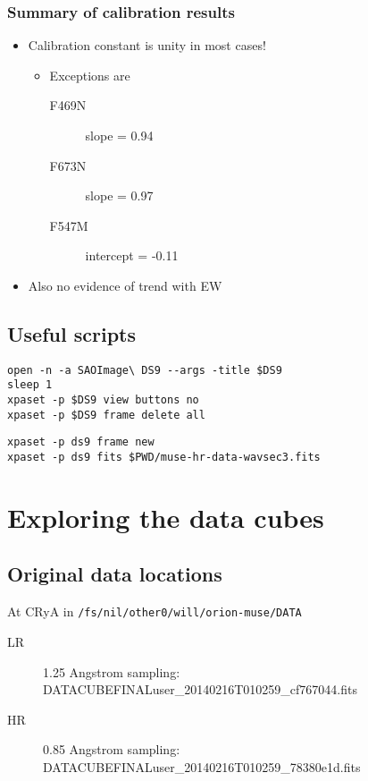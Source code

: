 \documentclass[11pt]{article}
\begin{document}
\subsubsection{Summary of calibration results}
\label{sec:orgheadline42}
\begin{itemize}
\item Calibration constant is unity in most cases!
\begin{itemize}
\item Exceptions are
\begin{description}
\item[{F469N}] slope = 0.94
\item[{F673N}] slope = 0.97
\item[{F547M}] intercept = -0.11
\end{description}
\end{itemize}
\item Also no evidence of trend with EW
\end{itemize}


\subsection{Useful scripts}
\label{sec:orgheadline44}
\begin{verbatim}
open -n -a SAOImage\ DS9 --args -title $DS9
sleep 1
xpaset -p $DS9 view buttons no
xpaset -p $DS9 frame delete all
\end{verbatim}

\begin{verbatim}
xpaset -p ds9 frame new
xpaset -p ds9 fits $PWD/muse-hr-data-wavsec3.fits
\end{verbatim}

\section{Exploring the data cubes}
\label{sec:orgheadline53}
\subsection{Original data locations}
\label{sec:orgheadline52}
At CRyA in \texttt{/fs/nil/other0/will/orion-muse/DATA} 
\begin{description}
\item[{LR}] 1.25 Angstrom sampling: DATACUBEFINALuser\_20140216T010259\_cf767044.fits
\item[{HR}] 0.85 Angstrom sampling: DATACUBEFINALuser\_20140216T010259\_78380e1d.fits
\end{description}
\end{document}
